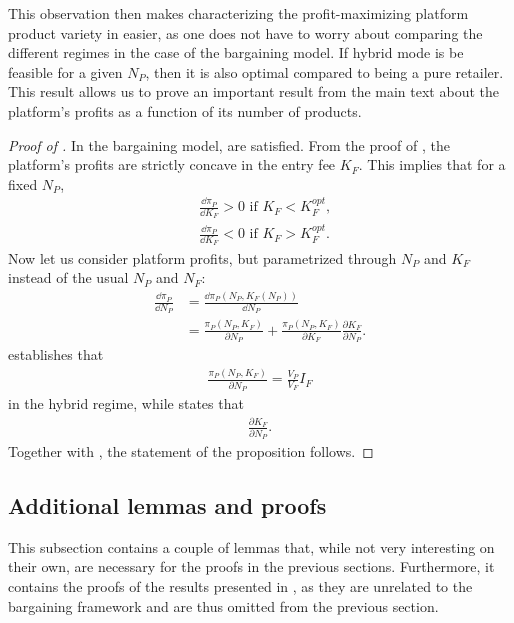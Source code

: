 This observation then makes characterizing the profit-maximizing platform product variety in  easier, as one does not have to worry about comparing the different regimes in the case of the bargaining model.
If hybrid mode is be feasible for a given $N_P$, then it is also optimal compared to being a pure retailer.
This result allows us to prove an important result from the main text about the platform's profits as a function of its number of products.
\begin{proof}[Proof of ]
    In the bargaining model,  are satisfied.
    From the proof of , the platform's profits are strictly concave in the entry fee $K_F$.
    This implies that for a fixed $N_P$,
    \begin{align}
        &\frac{\dd \pi_P}{\dd K_F} > 0 \text{ if } K_F < K_F^{opt}, \nonumber \\
        &\frac{\dd \pi_P}{\dd K_F} < 0 \text{ if } K_F > K_F^{opt}. \label{eq:profit_on_entry_fee}
    \end{align}
    Now let us consider platform profits, but parametrized through $N_P$ and $K_F$ instead of the usual $N_P$ and $N_F$:
    \begin{align*}
        \frac{\dd \pi_P}{\dd N_P} &= \frac{\dd \pi_P(N_P, K_F(N_P))}{\dd N_P} \\
        &= \frac{\pi_P(N_P, K_F)}{\partial N_P} + \frac{\pi_P(N_P, K_F)}{\partial K_F} \frac{\partial K_F}{\partial N_P}.
    \end{align*}
     establishes that
    \begin{align*}
        \frac{\pi_P(N_P, K_F)}{\partial N_P} = \frac{V_P}{V_F} I_F
    \end{align*}
    in the hybrid regime, while  states that
    \begin{align*}
        \frac{\partial K_F}{\partial N_P}.
    \end{align*}
    Together with , the statement of the proposition follows.
\end{proof}


\subsection{Additional lemmas and proofs}
\label{sec:lemmas}
This subsection contains a couple of lemmas that, while not very interesting on their own, are necessary for the proofs in the previous sections.
Furthermore, it contains the proofs of the results presented in , as they are unrelated to the bargaining framework and are thus omitted from the previous section.

